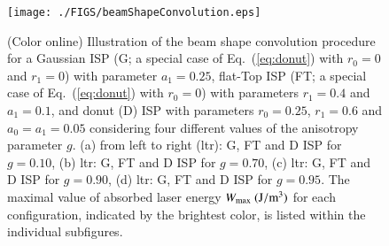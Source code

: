 \documentclass[review]{elsarticle}
\begin{document}
%
%
\begin{figure}[t!]
\centerline{\texttt{[image: ./FIGS/beamShapeConvolution.eps]} } 
\caption{(Color online) Illustration of the beam shape convolution procedure
for a Gaussian ISP (G; a special case of Eq.~(\ref{eq:donut}) with $r_0=0$ and
$r_1=0$) with parameter $a_1=0.25$, flat-Top ISP (FT; a special 
case of Eq.~(\ref{eq:donut}) with $r_0=0$) with parameters $r_1=0.4$ and $a_1=0.1$, 
and donut (D) ISP with parameters $r_0=0.25$, $r_1=0.6$ and $a_0=a_1=0.05$ 
considering four different values of the anisotropy parameter $g$.
(a) from left to right (ltr): G, FT and D ISP for $g=0.10$, 
(b) ltr: G, FT and D ISP for $g=0.70$, 
(c) ltr: G, FT and D ISP for $g=0.90$, 
(d) ltr: G, FT and D ISP for $g=0.95$. 
The maximal value of absorbed laser energy $W_{\rm max}~ ({\rm J/m^3})$
for each configuration, indicated by the brightest color, is listed within the
individual subfigures.
}
\label{fig:beamShapes}
\end{figure}
\end{document}
